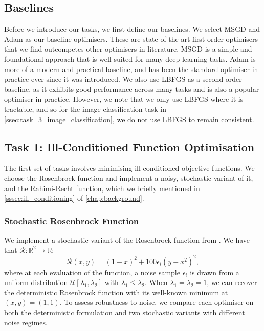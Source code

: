 \subsection{Baselines}
\label{ssec:baselines}
Before we introduce our tasks, we first define our baselines. We select MSGD and Adam as our baseline optimisers. These are state-of-the-art first-order optimisers that we find outcompetes other optimisers in literature. MSGD is a simple and foundational approach that is well-suited for many deep learning tasks. Adam is more of a modern and practical baseline, and has been the standard optimiser in practice ever since it was introduced. We also use LBFGS as a second-order baseline, as it exhibits good performance across many tasks and is also a popular optimiser in practice. However, we note that we only use LBFGS where it is tractable, and so for the image classification task in \cref{ssec:task_3_image_classification}, we do not use LBFGS to remain consistent.

\subsection{Task 1: Ill-Conditioned Function Optimisation}
\label{ssec:task_1_ill_conditioned_function_optimisation}
The first set of tasks involves minimising ill-conditioned objective functions. We choose the Rosenbrock function and implement a noisy, stochastic variant of it, and the Rahimi-Recht function, which we briefly mentioned in \cref{sssec:ill_conditioning} of \cref{chap:background}.

\subsubsection{Stochastic Rosenbrock Function}
\label{sssec:task_1_rosenbrock_function}
We implement a stochastic variant of the Rosenbrock function from \cite{NoceWrig06}. We have that $\mathcal{R}: \mathbb{R}^2 \rightarrow \mathbb{R}$:
\begin{equation}
\mathcal{R}(x, y) = (1 - x)^2 + 100\epsilon_i(y - x^2)^2,
\end{equation}
where at each evaluation of the function, a noise sample $\epsilon_i$ is drawn from a uniform distribution $\mathcal{U}[\lambda_1, \lambda_2]$ with $\lambda_1 \leq \lambda_2$. When $\lambda_1 = \lambda_2 = 1$, we can recover the deterministic Rosenbrock function with its well-known minimum at $(x, y) = (1, 1)$. To assess robustness to noise, we compare each optimiser on both the deterministic formulation and two stochastic variants with different noise regimes.


